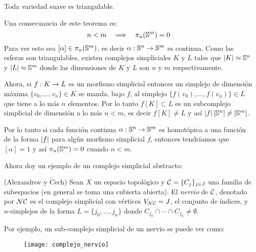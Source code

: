 \documentclass[../../topologia_algebraica]{subfiles}
\begin{document}
\begin{thm}
  Toda variedad suave es triangulable.
\end{thm}

\begin{nota}
	Una consecuancia de este teorema es:
	\begin{equation}\label{eq:pi_n_de_Sm_es_cero}
		n < m \quad\Longrightarrow\quad \pi_n(\mathbb{S}^m)=0
	\end{equation}
	Para ver esto sea $[\alpha]\in\pi_n(\mathbb{S}^m)$, es decir $\alpha:\mathbb{S}^n\rightarrow\mathbb{S}^m$ es continua. Como
	las esferas son triangulables, existen complejos simpliciales $K$ y $L$ tales que $\left| K \right|\approx\mathbb{S}^n$
	y $\left| L \right|\approx\mathbb{S}^m$ donde las dimensiones de $K$ y $L$ son $n$ y $m$ respectivamente.

	Ahora, si $f:K\rightarrow L$ es un morfismo simplicial entonces un simplejo de dimensi\'on m\'axima
	$\{v_0,\ldots,v_n\}\in K$ se manda, bajo $f$, al simplejo $\{f(v_0),\ldots,f(v_n)\}\in L$ que tiene
	a lo m\'as $n$ elementos. Por lo tanto $f[K]\subset L$ es un subcomplejo simplicial de dimensi\'on
	a lo m\'as $n<m$, es decir $f[K]\neq L$ y as\'i $\left| f \right|[\mathbb{S}^n]\neq[\mathbb{S}^m]$.

	Por lo tanto si cada funci\'on continua $\alpha:\mathbb{S}^n\rightarrow\mathbb{S}^m$ es homot\'opica a una funci\'on
	de la forma $\left| f \right|$ para alg\'un morfismo simplicial $f$, entonces tendr\'iamos que $[\alpha]=1$
	y as\'i $\pi_n(\mathbb{S}^m)=0$ cuando $n<m$.
\end{nota}

Ahora doy un ejemplo de un complejo simplicial abstracto:

\begin{defin}(Alexandrov y $\check{\text{C}}$ech)
  Sean $X$ un espacio topol\'ogico y $\mathcal{C}=\{C_j\}_{j\in J}$ una familia de subespacios (en general
  se toma una cubierta abierta). El \emph{nervio} de $\mathcal{C}$, denotado por $\mathcal{N}\mathcal{C}$ es el complejo
  simplicial con v\'ertices $V_{\mathcal{N}\mathcal{C}}=J$, el conjunto de \'indices, y $n$-simplejos de la forma
  $L=\{j_0,\ldots,j_n\}$ donde $C_{j_0}\cap\cdots\cap C_{j_n}\neq\emptyset$.
\end{defin}

Por ejemplo, un sub-complejo simplicial de un nervio se puede ver como:

\begin{figure}[h!]%
  \centering
  \texttt{[image: complejo\_nervio]}
\end{figure}%
\end{document}

